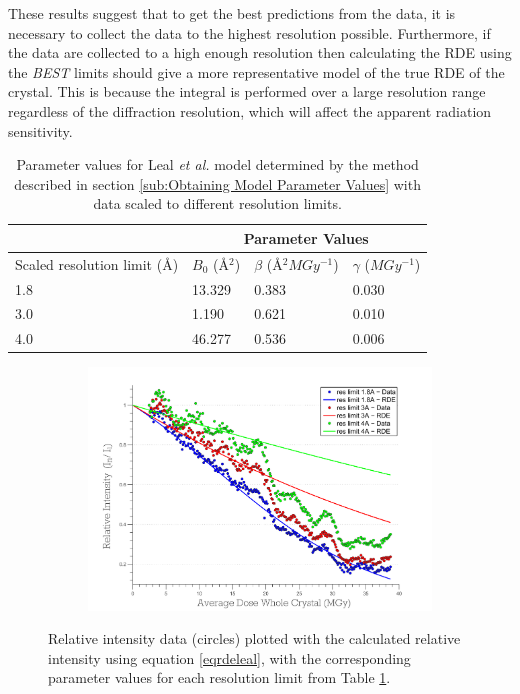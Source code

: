 These results suggest that to get the best predictions from the data, it is necessary to collect the data to the highest resolution possible.
Furthermore, if the data are collected to a high enough resolution then calculating the RDE using the \textit{BEST} limits should give a more representative model of the true RDE of the crystal.
This is because the integral is performed over a large resolution range regardless of the diffraction resolution, which will affect the apparent radiation sensitivity.

\begin{table}[ht!]
\small
\captionsetup{justification=centering}
	\caption{Parameter values for Leal \emph{et al.} model determined by the method described in section \ref{sub:Obtaining Model Parameter Values} with data scaled to different resolution limits.}
	\centering
	\begin{tabular}{p{4cm} p{2.4cm} p{2.4cm} p{2cm}}
	\cline{2-4}
		& \multicolumn{3}{c}{Parameter Values} \\
		\hline
		Scaled resolution limit (\AA)			&$B_0$ (\AA$^2$)	  &$\beta$ (\AA$^2MGy^{-1}$) 	 	&$\gamma$ ($MGy^{-1}$)		\\
		\hline
		1.8     													&13.329	    &0.383 			&0.030			\\
		3.0     													&1.190		&0.621  		&0.010			\\
		4.0     													&46.277		&0.536  		&0.006			\\
		\hline
	\end{tabular}
	\label{tab:RDE params3}
\end{table}
\begin{figure}
	\centering
	\begin{subfigure}[b]{1\textwidth}
        \centering
        \includegraphics[width=\textwidth]{figures/dwd/rescmpplot1.pdf}
        \caption{}
        \label{fig:Resolution comparison plot - scaled to diff res}
    \end{subfigure}
	\caption{Relative intensity data (circles) plotted with the calculated relative intensity using equation \ref{eqrdeleal}, with the corresponding parameter values for each resolution limit from Table \ref{tab:RDE params3}.}
	\label{figres}
\end{figure}
